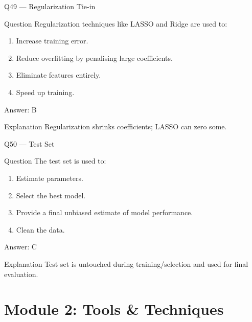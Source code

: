 \documentclass[aspectratio=169,8pt]{beamer}
\begin{document}
	\begin{frame}{Q49 --- Regularization Tie-in}
		\begin{block}{Question}
			Regularization techniques like LASSO and Ridge are used to:
		\end{block}
		\begin{enumerate}
			\item Increase training error.
			\item Reduce overfitting by penalising large coefficients.
			\item Eliminate features entirely.
			\item Speed up training.
		\end{enumerate}
		\begin{exampleblock}{Answer: B}\end{exampleblock}
		\begin{block}{Explanation}
			Regularization shrinks coefficients; LASSO can zero some.
		\end{block}
	\end{frame}
	
	\begin{frame}{Q50 --- Test Set}
		\begin{block}{Question}
			The test set is used to:
		\end{block}
		\begin{enumerate}
			\item Estimate parameters.
			\item Select the best model.
			\item Provide a final unbiased estimate of model performance.
			\item Clean the data.
		\end{enumerate}
		\begin{exampleblock}{Answer: C}\end{exampleblock}
		\begin{block}{Explanation}
			Test set is untouched during training/selection and used for final evaluation.
		\end{block}
	\end{frame}
	
	\section{Module 2: Tools \& Techniques}
	
\end{document}
